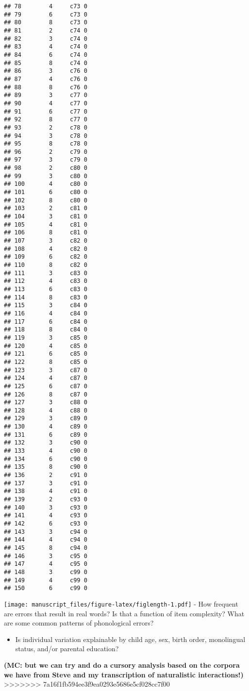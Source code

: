 \documentclass[english,,man,floatsintext]{apa6}
\providecommand{\tightlist}{%
  \setlength{\itemsep}{0pt}\setlength{\parskip}{0pt}}
\begin{document}
\begin{verbatim}
## 78        4     c73 0
## 79        6     c73 0
## 80        8     c73 0
## 81        2     c74 0
## 82        3     c74 0
## 83        4     c74 0
## 84        6     c74 0
## 85        8     c74 0
## 86        3     c76 0
## 87        4     c76 0
## 88        8     c76 0
## 89        3     c77 0
## 90        4     c77 0
## 91        6     c77 0
## 92        8     c77 0
## 93        2     c78 0
## 94        3     c78 0
## 95        8     c78 0
## 96        2     c79 0
## 97        3     c79 0
## 98        2     c80 0
## 99        3     c80 0
## 100       4     c80 0
## 101       6     c80 0
## 102       8     c80 0
## 103       2     c81 0
## 104       3     c81 0
## 105       4     c81 0
## 106       8     c81 0
## 107       3     c82 0
## 108       4     c82 0
## 109       6     c82 0
## 110       8     c82 0
## 111       3     c83 0
## 112       4     c83 0
## 113       6     c83 0
## 114       8     c83 0
## 115       3     c84 0
## 116       4     c84 0
## 117       6     c84 0
## 118       8     c84 0
## 119       3     c85 0
## 120       4     c85 0
## 121       6     c85 0
## 122       8     c85 0
## 123       3     c87 0
## 124       4     c87 0
## 125       6     c87 0
## 126       8     c87 0
## 127       3     c88 0
## 128       4     c88 0
## 129       3     c89 0
## 130       4     c89 0
## 131       6     c89 0
## 132       3     c90 0
## 133       4     c90 0
## 134       6     c90 0
## 135       8     c90 0
## 136       2     c91 0
## 137       3     c91 0
## 138       4     c91 0
## 139       2     c93 0
## 140       3     c93 0
## 141       4     c93 0
## 142       6     c93 0
## 143       3     c94 0
## 144       4     c94 0
## 145       8     c94 0
## 146       3     c95 0
## 147       4     c95 0
## 148       3     c99 0
## 149       4     c99 0
## 150       6     c99 0
\end{verbatim}

\texttt{[image: manuscript\_files/figure-latex/figlength-1.pdf]}
- How frequent are errors that result in real words? Is that a function of item complexity? What are some common patterns of phonological errors?

\begin{itemize}
\tightlist
\item
  Is individual variation explainable by child age, sex, birth order, monolingual status, and/or parental education?
\end{itemize}

\textbf{(MC: but we can try and do a cursory analysis based on the corpora we have from Steve and my transcription of naturalistic interactions!)}
>>>>>>> 7a16f1fb594ee3f9ea0293e5686e5cf028cc7f00
\end{document}
